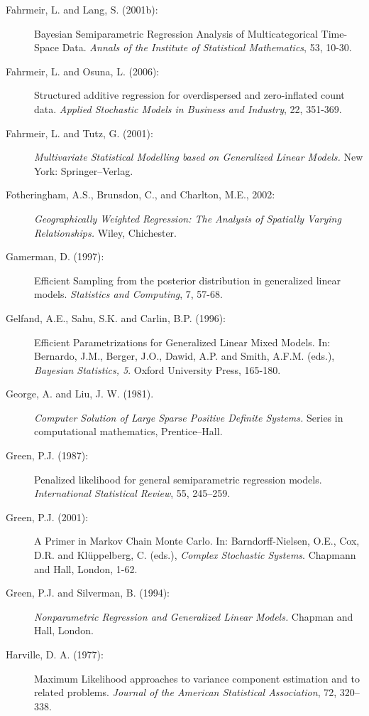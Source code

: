 \documentclass[11pt,a4paper,twoside]{bayesxarticle}
\begin{document}
\begin{description}
\item[Fahrmeir, L. and Lang, S. (2001b):] Bayesian Semiparametric Regression Analysis of Multicategorical
Time-Space Data. {\em Annals of the  Institute of Statistical
Mathematics}, 53, 10-30.

\item[Fahrmeir, L. and Osuna, L. (2006):] Structured additive regression for
overdispersed and zero-inflated count data. {\em Applied Stochastic
Models in Business and Industry}, 22, 351-369.

\item[Fahrmeir, L. and Tutz, G. (2001):] {\em Multivariate Statistical
Modelling based on Generalized Linear Models.} New York:
Springer--Verlag.

\item[Fotheringham, A.S., Brunsdon, C., and Charlton, M.E., 2002:]
{\it Geographically Weighted Regression: The Analysis of Spatially
Varying Relationships.} Wiley, Chichester.

\item[Gamerman, D. (1997):] Efficient Sampling from the posterior distribution
in generalized linear models. {\em Statistics and Computing}, 7,
57-68.

\item[Gelfand, A.E., Sahu, S.K. and Carlin, B.P. (1996):] Efficient Parametrizations for
Generalized Linear Mixed Models. In: Bernardo, J.M., Berger, J.O.,
Dawid, A.P. and Smith, A.F.M. (eds.), {\em Bayesian Statistics,
5}. Oxford University Press, 165-180.

\item[George, A. and Liu, J. W. (1981).] {\em Computer Solution of Large
Sparse Positive Definite Systems.} Series in computational
mathematics, Prentice--Hall.

\item[Green, P.J. (1987):] Penalized
likelihood for general semiparametric regression models. {\it
International Statistical Review}, 55, 245--259.

\item[Green, P.J. (2001):] A Primer in Markov Chain Monte Carlo. In: Barndorff-Nielsen, O.E.,
Cox, D.R. and Kl\"{u}ppelberg, C. (eds.), {\em Complex Stochastic
Systems}. Chapmann and Hall, London, 1-62.

\item[Green, P.J. and Silverman, B. (1994):] {\em Nonparametric Regression and Generalized Linear Models.} Chapman
and Hall, London.

\item[Harville, D. A. (1977):]
Maximum Likelihood approaches to variance component estimation and
to related problems. {\it Journal of the American Statistical
Association}, 72, 320--338.


\end{description}
\end{document}
